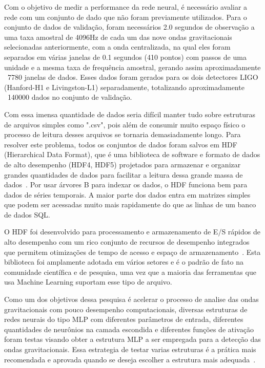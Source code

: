 Com o objetivo de medir a performance da rede neural, é necessário avaliar a rede com um conjunto de dado que não foram previamente utilizados. Para o conjunto de dados de validação, foram necessários 2.0 segundos de observação a uma taxa amostral de 4096Hz de cada um das nove ondas gravitacionais selecionadas anteriormente, com a onda centralizada, na qual eles foram separados em várias janelas de 0.1 segundos (410 pontos) com passos de uma unidade e a mesma taxa de frequência amostral, gerando assim aproximadamente ~7780 janelas de dados. Esses dados foram gerados para os dois detectores LIGO (Hanford-H1 e Livingston-L1) separadamente, totalizando aproximadamente ~140000 dados no conjunto de validação.

Com essa imensa quantidade de dados seria difícil manter tudo sobre estruturas de arquivos simples como ".csv", pois além de consumir muito espaço físico o processo de leitura desses arquivos se tornaria demasiadamente longo. Para resolver este problema, todos os conjuntos de dados foram salvos em HDF (Hierarchical Data Format), que é uma biblioteca de software e formato de dados de alto desempenho (HDF4, HDF5) projetados para armazenar e organizar grandes quantidades de dados para facilitar a leitura dessa grande massa de dados~\cite{hdf}. Por usar árvores B para indexar os dados, o HDF funciona bem para dados de séries temporais. A maior parte dos dados entra em matrizes simples que podem ser acessadas muito mais rapidamente do que as linhas de um banco de dados SQL. 

O HDF foi desenvolvido para processamento e armazenamento de E/S rápidos de alto desempenho com um rico conjunto de recursos de desempenho integrados que permitem otimizações de tempo de acesso e espaço de armazenamento~\cite{hdf}. Esta biblioteca foi amplamente adotada em vários setores e é o padrão de fato na comunidade científica e de pesquisa, uma vez que a maioria das ferramentas que usa Machine Learning suportam esse tipo de arquivo.

Como um dos objetivos dessa pesquisa é acelerar o processo de analise das ondas gravitacionais com pouco desempenho computacionais, diversas estruturas de redes neurais do tipo MLP com diferentes parâmetros de entrada, diferentes quantidades de neurônios na camada escondida e diferentes funções de ativação foram testas visando obter a estrutura MLP a ser empregada para a detecção das ondas gravitacionais. Essa estrategia de testar varias estruturas é a prática mais recomendada e aprovada quando se deseja escolher a estrutura mais adequada~\cite{OKOH201619}.

